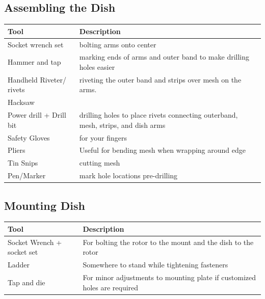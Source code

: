 \documentclass[11pt]{article} %
\begin{document}
\subsection{Assembling the Dish}
\begin{tabular}{| l | p{10cm} |}
\hline
\textbf{Tool} & \textbf{Description} \\ \hline \hline
Socket wrench set & bolting arms onto center\\ \hline
Hammer and tap & marking ends of arms and outer band to make drilling holes easier\\ \hline
Handheld Riveter/ rivets & riveting the outer band and strips over mesh on the arms.\\ \hline
Hacksaw & \\ \hline
Power drill + Drill bit & drilling holes to place rivets connecting outerband, mesh, strips, and dish arms\\ \hline
Safety Gloves & for your fingers\\ \hline
Pliers & Useful for bending mesh when wrapping around edge\\ \hline
Tin Snips & cutting mesh\\ \hline
Pen/Marker & mark hole locations pre-drilling\\ \hline
\end{tabular}


\subsection{Mounting Dish}
\begin{tabular}{| l | p{10cm} |}
\hline
\textbf{Tool} & \textbf{Description} \\ \hline \hline
Socket Wrench + socket set & For bolting the rotor to the mount and the dish to the rotor \\ \hline
Ladder & Somewhere to stand while tightening fasteners \\ \hline
Tap and die & For minor adjustments to mounting plate if customized holes are required \\ \hline
\end{tabular}
\end{document}
